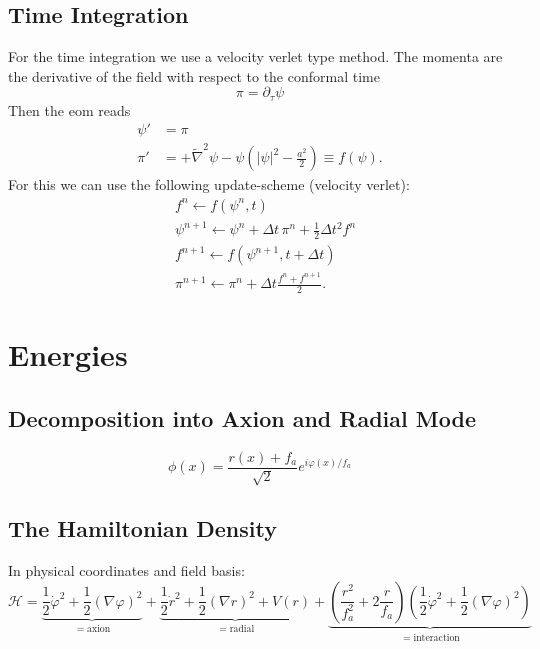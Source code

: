 \documentclass[a4paper]{article}
\begin{document}
\subsection{Time Integration}
For the time integration we use a velocity verlet type method.
The momenta are the derivative of the field with respect to the conformal time
\begin{equation}
	\pi = \partial_\tau \psi
\end{equation} 
Then the eom reads
\begin{align}
	\psi' &= \pi \\
	\pi'  &= + \tilde{\nabla}^2 \psi - \psi ( |\psi|^2 - \frac{a^2}{2} ) \equiv f(\psi).
\end{align}
For this we can use the following update-scheme (velocity verlet):
\begin{align}
	&f^n \leftarrow f(\psi^n, t) \\
	&\psi^{n + 1} \leftarrow \psi^n + \Delta t \, \pi^n + \frac{1}{2} \Delta t^2 f^n \\
	&f^{n + 1} \leftarrow f(\psi^{n + 1}, t + \Delta t) \\
	&\pi^{n + 1} \leftarrow \pi^n + \Delta t \frac{f^n + f^{n + 1}}{2}.
\end{align}


\section{Energies}

\subsection{Decomposition into Axion and Radial Mode}
\begin{equation}
    \phi(x) = \frac{r(x) + f_a}{\sqrt{2}} e^{i \varphi(x) / f_a }
\end{equation}

\subsection{The Hamiltonian Density}
In physical coordinates and field basis:
\begin{equation}
    \mathcal{H} =
    \underbrace{\frac{1}{2} \dot{\varphi}^2 + \frac{1}{2} (\nabla \varphi)^2}_{= \mathrm{axion}} +
    \underbrace{\frac{1}{2} \dot{r}^2 + \frac{1}{2} (\nabla r)^2 + V(r)}_{= \mathrm{radial}} +
    \underbrace{\left( \frac{r^2}{f_a^2} + 2 \frac{r}{f_a} \right) \left( \frac{1}{2} \dot{\varphi}^2 + \frac{1}{2} (\nabla \varphi)^2 \right)}_{= \mathrm{interaction}}
\end{equation}
\end{document}
